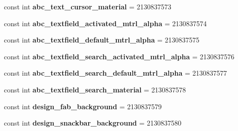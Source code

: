 \begin{DoxyCompactItemize}
const int {\bfseries abc\+\_\+text\+\_\+cursor\+\_\+material} = 2130837573
\item 
\mbox{\label{class_pinned_app_1_1_droid_1_1_resource_1_1_drawable_afcede99538ae91c9fd1a201047e94acc}} 
const int {\bfseries abc\+\_\+textfield\+\_\+activated\+\_\+mtrl\+\_\+alpha} = 2130837574
\item 
\mbox{\label{class_pinned_app_1_1_droid_1_1_resource_1_1_drawable_adab1d9f0aaf7f48258d2661a0863af7e}} 
const int {\bfseries abc\+\_\+textfield\+\_\+default\+\_\+mtrl\+\_\+alpha} = 2130837575
\item 
\mbox{\label{class_pinned_app_1_1_droid_1_1_resource_1_1_drawable_a7d064a13df3b954a99fbbbe4195e8085}} 
const int {\bfseries abc\+\_\+textfield\+\_\+search\+\_\+activated\+\_\+mtrl\+\_\+alpha} = 2130837576
\item 
\mbox{\label{class_pinned_app_1_1_droid_1_1_resource_1_1_drawable_a08b4b93283b36356e8888a3a718516f4}} 
const int {\bfseries abc\+\_\+textfield\+\_\+search\+\_\+default\+\_\+mtrl\+\_\+alpha} = 2130837577
\item 
\mbox{\label{class_pinned_app_1_1_droid_1_1_resource_1_1_drawable_adcfc7d18646cf5a9dd5e1cc8e4e112fe}} 
const int {\bfseries abc\+\_\+textfield\+\_\+search\+\_\+material} = 2130837578
\item 
\mbox{\label{class_pinned_app_1_1_droid_1_1_resource_1_1_drawable_abae341812688a64ceb28776a6a30586c}} 
const int {\bfseries design\+\_\+fab\+\_\+background} = 2130837579
\item 
\mbox{\label{class_pinned_app_1_1_droid_1_1_resource_1_1_drawable_acac7c71e9053c7e68857782d58e287f9}} 
const int {\bfseries design\+\_\+snackbar\+\_\+background} = 2130837580
\item 
\mbox{\label{class_pinned_app_1_1_droid_1_1_resource_1_1_drawable_a6ebb270f5c9e73d99c26848218980ad8}} 

\end{DoxyCompactItemize}
